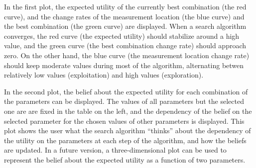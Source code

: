 \documentclass{article}
\begin{document}
In the first plot, the expected utility of the currently best
combination (the red curve), and the change rates of the measurement
location (the blue curve) and the best combination (the green curve)
are displayed. When a search algorithm converges, the red curve (the
expected utility) should stabilize around a high value, and the green
curve (the best combination change rate) should approach zero. On the
other hand, the blue curve (the measurement location change rate)
should keep moderate values during most of the algorithm, alternating
betwen relatively low values (exploitation) and high values (exploration).

In the second plot, the belief about the expected utility for each
combination of the parameters can be displayed. The values of all
parameters but the selected one are are fixed in the table on the
left, and the dependency of the belief on the selected parameter for
the chosen values of other parameters is displayed. This plot shows
the user what the search algorithm ``thinks'' about the dependency of
the utility on the parameters at each step of the algorithm, and how
the beliefs are updated. In a future version, a three-dimensional plot
can be used to represent the belief about the expected utility as a
function of two parameters.
\end{document}
